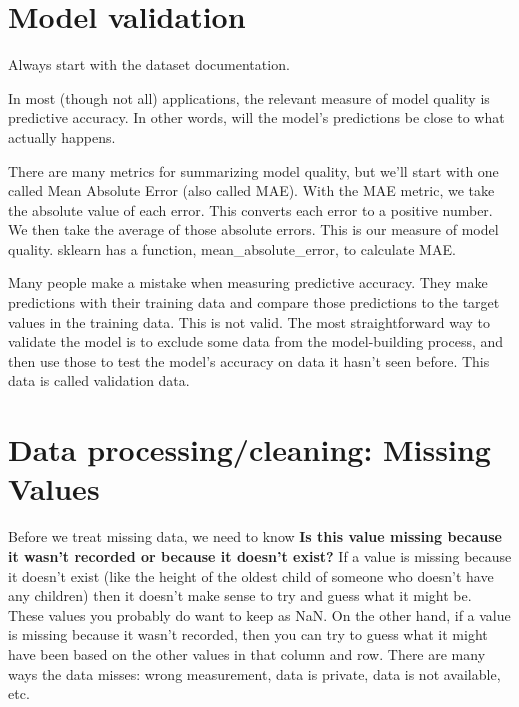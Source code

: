 \documentclass[12pt]{report}
\begin{document}
\section{Model validation}

Always start with the dataset documentation.

In most (though not all) applications, the relevant measure of model quality is predictive accuracy. In other words, will the model's predictions be close to what actually happens.

There are many metrics for summarizing model quality, but we'll start with one called Mean Absolute Error (also called MAE). With the MAE metric, we take the absolute value of each error. This converts each error to a positive number. We then take the average of those absolute errors. This is our measure of model quality. sklearn has a function, mean\_absolute\_error, to calculate MAE.


Many people make a mistake when measuring predictive accuracy. They make predictions with their training data and compare those predictions to the target values in the training data. This is not valid. The most straightforward way to validate the model is to exclude some data from the model-building process, and then use those to test the model's accuracy on data it hasn't seen before. This data is called validation data.

\section{Data processing/cleaning: Missing Values}
\label{sec:missing}

Before we treat missing data, we need to know \textbf{Is this value missing because it wasn't recorded or because it doesn't exist?} If a value is missing because it doesn't exist (like the height of the oldest child of someone who doesn't have any children) then it doesn't make sense to try and guess what it might be. These values you probably do want to keep as NaN. On the other hand, if a value is missing because it wasn't recorded, then you can try to guess what it might have been based on the other values in that column and row.  There are many ways the data misses: wrong measurement, data is private, data is not available, etc.
\end{document}
